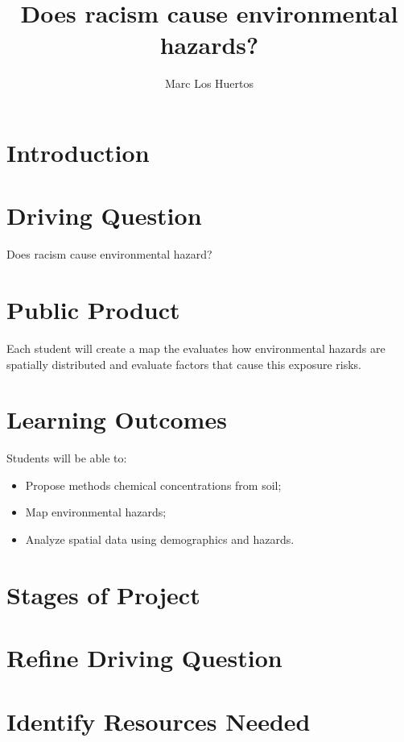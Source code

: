 \documentclass{article}
\author{Marc Los Huertos}
\title{Does racism cause environmental hazards?}
\begin{document}

\maketitle

\section{Introduction}

\section{Driving Question}

Does racism cause environmental hazard?

\section{Public Product}

Each student will create a map the evaluates how environmental hazards are spatially distributed and evaluate factors that cause this exposure risks.


\section{Learning Outcomes}

Students will be able to: 

\begin{itemize}
  \item Propose methods chemical concentrations from soil;
  \item Map environmental hazards;
  \item Analyze spatial data using demographics and hazards.

\end{itemize}

\section{Stages of Project}

\section{Refine Driving Question}

\section{Identify Resources Needed}
\end{document}
